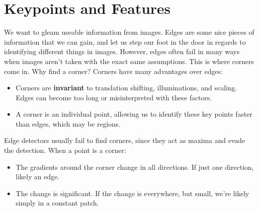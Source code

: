 \documentclass{article}
\begin{document}
\section{Keypoints and Features}
We want to gleam useable information from images. Edges are some nice pieces of information that we can gain, and let us step our foot in the door in regards to identifying different things in images. However, edges often fail in many ways when images aren't taken with the exact same assumptions. This is where corners come in. Why find a corner? Corners have many advantages over edges:
\begin{itemize}
    \item Corners are \textbf{invariant} to translation shifting, illuminations, and scaling. Edges can become too long or misinterpreted with these factors.
    \item A corner is an individual point, allowing us to identify these key points faster than edges, which may be regions.
\end{itemize}
Edge detectors usually fail to find corners, since they act as maxima and evade the detection. When a point is a corner:
\begin{itemize}
    \item The gradients around the corner change in all directions. If just one direction, likely an edge.
    \item The change is significant. If the change is everywhere, but small, we're likely simply in a constant patch.
\end{itemize}
\end{document}
